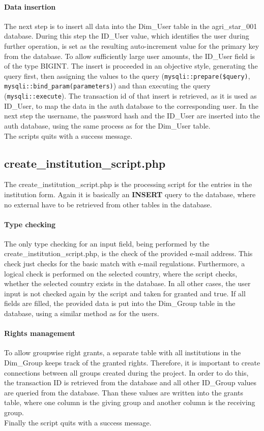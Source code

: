 \paragraph{Data insertion}
The next step is to insert all data into the 
Dim\_User table in the agri\_star\_001 database. During this step the ID\_User value, which identifies the user during further operation, is set as the resulting auto-increment 
value for the primary key from the database. To allow sufficiently large user amounts, the ID\_User field is of the type BIGINT. 
The insert is proceeded in an objective style, generating the query first, then assigning the values to the query (\texttt{mysqli::prepare(\$query)}, \texttt{mysqli::bind\_param(parameters)}) and 
than executing the query (\texttt{mysqli::execute}). 
The transaction id of that insert is retrieved, as it is used as ID\_User, to map the data in the auth database to the corresponding user. 
In the next step the username, the password hash and the ID\_User are inserted into the auth database, using the same process as for the Dim\_User table.\\
The scripts quits with a success message.

\label{create_institution_script.php}
\subsection{create\_institution\_script.php}
The create\_institution\_script.php is the processing script for the entries in the institution form. Again it is basically an \textbf{INSERT} query to the database, where no 
external have to be retrieved from other tables in the database. 
\paragraph{Type checking} The only type checking for an input field, being performed by the create\_institution\_script.php, is the check 
of the provided e-mail address. This check just checks for the basic match with e-mail regulations. Furthermore, a logical check is performed on the selected country, where the 
script checks, whether the selected country exists in the database. In all other cases, the user input is not checked again by the script and taken for granted and true. 
If all fields are filled, the provided data is put into the Dim\_Group table in the database, using a similar method as for the users.
\paragraph{Rights management} To allow groupwise right grants, a separate table with all institutions in the Dim\_Group keeps track of the granted rights. Therefore, it is important to create 
connections between all groups created during the project. In order to do this, the transaction ID is retrieved from the database and all other ID\_Group values are queried from the database. Than 
these values are written into the grants table, where one column is the giving group and another column is the receiving group. \\
Finally the script quits with a success message.

